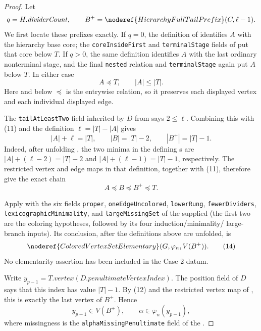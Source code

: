 \begin{proof}
Let
\[
 q=H.\mathit{dividerCount},\qquad
 B^+=\noderef{HierarchyFullTailPrefix}(C,\ell-1).
\]
We first locate these prefixes exactly.  If \(q=0\), the definition of
 identifies \(A\) with the hierarchy base
core; the \texttt{coreInsideFirst} and \texttt{terminalStage} fields of
 put that core below \(T\).  If \(q>0\), the
same definition identifies \(A\) with the last ordinary nonterminal stage,
and the final \texttt{nested} relation and \texttt{terminalStage} again put
\(A\) below \(T\).  In either case
\[
          A\preccurlyeq T,\qquad |A|\leq |T|.             \tag{11}
\]
Here and below \(\preccurlyeq\) is the entrywise
 relation, so it preserves each
displayed vertex and each individual displayed edge.

The \texttt{tailAtLeastTwo} field inherited by \(D\) from
 says \(2\leq\ell\).  Combining
this with (11) and the definition \(\ell=|T|-|A|\) gives
\[
 |A|+\ell=|T|,\qquad |B|=|T|-2,\qquad |B^+|=|T|-1.         \tag{12}
\]
Indeed, after unfolding , the two
minima in the defining s are
\(|A|+(\ell-2)=|T|-2\) and
\(|A|+(\ell-1)=|T|-1\), respectively.  The restricted vertex and edge
maps in that definition, together with (11), therefore give the exact
chain
\[
                   A\preccurlyeq B\preccurlyeq B^+
                     \preccurlyeq T.                       \tag{13}
\]

Apply  with the
six fields \texttt{proper}, \texttt{oneEdgeUncolored},
\texttt{lowerRung}, \texttt{fewerDividers},
\texttt{lexicographicMinimality}, and \texttt{largeMissingSet} of the
supplied  (the first two
are the coloring hypotheses, followed by its four induction/minimality/
large-branch inputs).  Its conclusion, after the definitions above are
unfolded, is
\[
        \noderef{ColoredVertexSetElementary}
          (G,\varphi_n,V(B^+)).                             \tag{14}
\]
No elementarity assertion has been included in the Case 2 datum.

Write \(y_{p-1}=T.\mathit{vertex}
(D.\mathit{penultimateVertexIndex})\).  The position field of \(D\)
says that this index has value \(|T|-1\).  By (12) and the restricted
vertex map of , this is exactly the last
vertex of \(B^+\).  Hence
\[
 y_{p-1}\in V(B^+),\qquad
 \alpha\in\overline\varphi_n(y_{p-1}),                    \tag{15}
\]
where missingness is the \texttt{alphaMissingPenultimate} field of the
.


\end{proof}
